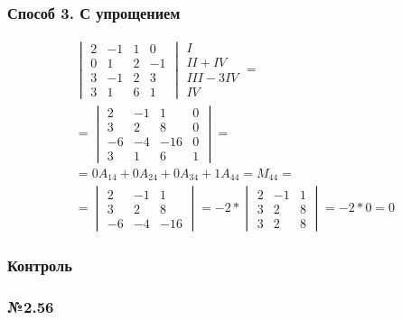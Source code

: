 \documentclass{article}
\begin{document}
\subsubsection{Способ 3. С упрощением}

\begin{gather*}
	\begin{vmatrix}
		2 & -1 & 1 & 0 \\
		0 & 1 & 2 & -1 \\
		3 & -1 & 2 & 3 \\
		3 & 1 & 6 & 1
	\end{vmatrix}
	\begin{matrix}
		I \\
		II + IV \\
		III - 3IV \\
		IV
	\end{matrix} = \\
	= \begin{vmatrix}
		2 & -1 & 1 & 0 \\
		3 & 2 & 8 & 0 \\
		-6 & -4 & -16 & 0 \\
		3 & 1 & 6 & 1
	\end{vmatrix} = \\
	= 0 A_{14} + 0 A_{24} + 0 A_{34} + 1 A_{44} =
	M_{44} = \\
	= \begin{vmatrix}
		2 & -1 & 1 \\
		3 & 2 & 8 \\
		-6 & -4 & -16
	\end{vmatrix}
	= -2 * \begin{vmatrix}
		2 & -1 & 1 \\
		3 & 2 & 8 \\
		3 & 2 & 8
	\end{vmatrix}
	= -2 * 0 = 0
\end{gather*}

\subsubsection{Контроль}

\subsubsection*{№2.56}
\end{document}
